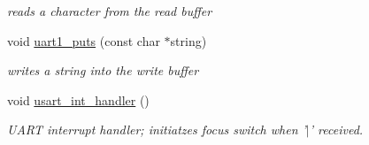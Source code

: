 \begin{CompactItemize}
\begin{CompactList}\small\item\em reads a character from the read buffer \item\end{CompactList}\item 
void \hyperlink{group___u_a_r_t_ga5b52914c1970eda2abf78b6891c5202}{uart1\_\-puts} (const char $\ast$string)
\begin{CompactList}\small\item\em writes a string into the write buffer \item\end{CompactList}\item 
\hypertarget{group___u_a_r_t_g7a4362872363cb4449f1710361dab520}{
void \hyperlink{group___u_a_r_t_g7a4362872363cb4449f1710361dab520}{usart\_\-int\_\-handler} ()}
\label{group___u_a_r_t_g7a4362872363cb4449f1710361dab520}

\begin{CompactList}\small\item\em UART interrupt handler; initiatzes focus switch when '$|$' received. \item\end{CompactList}\end{CompactItemize}

